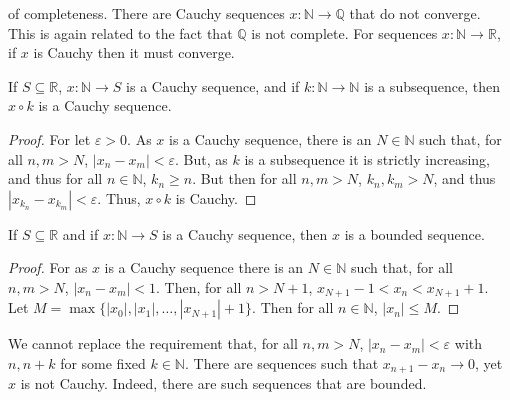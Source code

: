         of completeness. There are Cauchy sequences
        $x:\mathbb{N}\rightarrow\mathbb{Q}$ that do
        not converge. This is again related to the fact
        that $\mathbb{Q}$ is not complete. For sequences
        $x:\mathbb{N}\rightarrow\mathbb{R}$,
        if $x$ is Cauchy then it must converge.
        \begin{theorem}
            \label{THM:FUNCTIONAL_ANALYSIS:%
                   SUBSEQ_OF_CAUCHY_IS_CAUCHY}
            If $S\subseteq\mathbb{R}$,
            $x:\mathbb{N}\rightarrow{S}$ is a Cauchy sequence,
            and if $k:\mathbb{N}\rightarrow\mathbb{N}$
            is a subsequence, then
            $x\circ{k}$ is a Cauchy sequence.
        \end{theorem}
        \begin{proof}
            For let $\varepsilon>0$. As $x$ is a Cauchy
            sequence, there is an $N\in\mathbb{N}$ such that,
            for all $n,m>N$, $|x_{n}-x_{m}|<\varepsilon$.
            But, as $k$ is a subsequence it is strictly
            increasing, and thus for all $n\in\mathbb{N}$,
            $k_{n}\geq{n}$. But then for all $n,m>N$,
            $k_{n},k_{m}>N$, and thus
            $|x_{k_{n}}-x_{k_{m}}|<\varepsilon$. Thus,
            $x\circ{k}$ is Cauchy.
        \end{proof}
        \begin{theorem}
            If $S\subseteq\mathbb{R}$ and if
            $x:\mathbb{N}\rightarrow{S}$ is a Cauchy sequence,
            then $x$ is a bounded sequence.
        \end{theorem}
        \begin{proof}
            For as $x$ is a Cauchy sequence there is an
            $N\in\mathbb{N}$ such that, for all $n,m>N$,
            $|x_{n}-x_{m}|<1$. Then, for all $n>N+1$,
            $x_{N+1}-1<x_{n}<x_{N+1}+1$. Let
            $M=\max\{|x_{0}|,|x_{1}|,\hdots,|x_{N+1}|+1\}$.
            Then for all $n\in\mathbb{N}$,
            $|x_{n}|\leq{M}$.
        \end{proof}
        We cannot replace the requirement that,
        for all $n,m>N$, $|x_{n}-x_{m}|<\varepsilon$
        with $n,n+k$ for some fixed $k\in\mathbb{N}$.
        There are sequences such that
        $x_{n+1}-x_{n}\rightarrow{0}$,
        yet $x$ is not Cauchy. Indeed, there are such sequences
        that are bounded.
